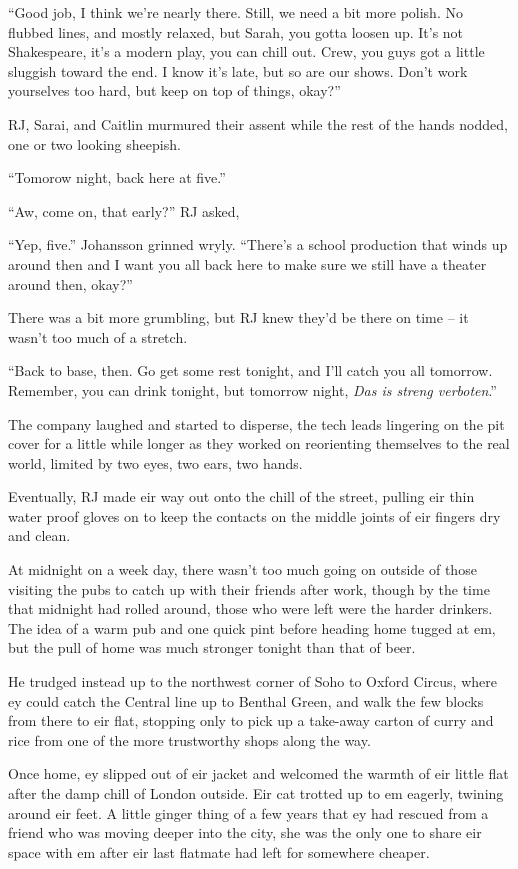 ``Good job, I think we're nearly there. Still, we need a bit more polish. No flubbed lines, and mostly relaxed, but Sarah, you gotta loosen up. It's not Shakespeare, it's a modern play, you can chill out. Crew, you guys got a little sluggish toward the end. I know it's late, but so are our shows. Don't work yourselves too hard, but keep on top of things, okay?''

RJ, Sarai, and Caitlin murmured their assent while the rest of the hands nodded, one or two looking sheepish.

``Tomorow night, back here at five.''

``Aw, come on, that early?'' RJ asked,

``Yep, five.'' Johansson grinned wryly. ``There's a school production that winds up around then and I want you all back here to make sure we still have a theater around then, okay?''

There was a bit more grumbling, but RJ knew they'd be there on time -- it wasn't too much of a stretch.

``Back to base, then. Go get some rest tonight, and I'll catch you all tomorrow. Remember, you can drink tonight, but tomorrow night, \textit{Das is streng verboten}.''

The company laughed and started to disperse, the tech leads lingering on the pit cover for a little while longer as they worked on reorienting themselves to the real world, limited by two eyes, two ears, two hands.

Eventually, RJ made eir way out onto the chill of the street, pulling eir thin water proof gloves on to keep the contacts on the middle joints of eir fingers dry and clean.

At midnight on a week day, there wasn't too much going on outside of those visiting the pubs to catch up with their friends after work, though by the time that midnight had rolled around, those who were left were the harder drinkers. The idea of a warm pub and one quick pint before heading home tugged at em, but the pull of home was much stronger tonight than that of beer.

He trudged instead up to the northwest corner of Soho to Oxford Circus, where ey could catch the Central line up to Benthal Green, and walk the few blocks from there to eir flat, stopping only to pick up a take-away carton of curry and rice from one of the more trustworthy shops along the way.

Once home, ey slipped out of eir jacket and welcomed the warmth of eir little flat after the damp chill of London outside. Eir cat trotted up to em eagerly, twining around eir feet. A little ginger thing of a few years that ey had rescued from a friend who was moving deeper into the city, she was the only one to share eir space with em after eir last flatmate had left for somewhere cheaper.

